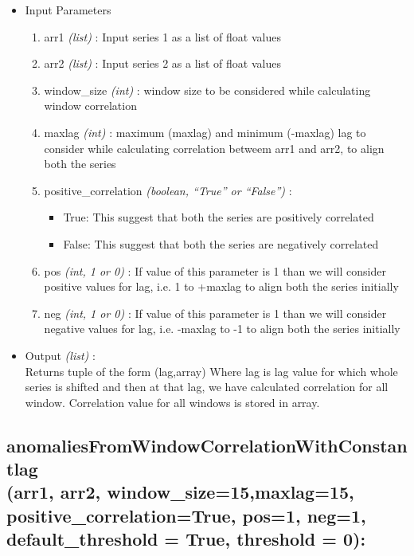 \begin{itemize}
 \item Input Parameters
 
 \begin{enumerate}
  \item arr1 \textit{(list)} : Input series 1 as a list of float values
  \item arr2 \textit{(list)} : Input series 2 as a list of float values
  \item window\_size \textit{(int)} : window size to be considered while 
calculating window correlation
  \item maxlag \textit{(int)} : maximum (maxlag) and minimum (-maxlag) lag to 
consider while calculating correlation betweem arr1 and arr2, to align both the 
series
  \item positive\_correlation \textit{(boolean, ``True'' or ``False'')} : 
      \begin{itemize}
       \item True: This suggest that both the series are positively correlated
       \item False: This suggest that both the series are negatively correlated
      \end{itemize}
      
  \item pos \textit{(int, 1 or 0)} : If value of this parameter is 1 than we 
will consider positive values for lag, i.e. 1 to +maxlag to align both the 
series initially
  \item neg \textit{(int, 1 or 0)} : If value of this parameter is 1 than we 
will consider negative values for lag, i.e. -maxlag to -1 to align both the 
series initially
  
 \end{enumerate}

 \item Output \textit{(list)} : \\
  Returns tuple of the form (lag,array)
Where lag is lag value for which whole series is shifted and then at that lag, 
we have calculated correlation for all window. Correlation value for all 
windows is stored in array.
 
\end{itemize}

\subsection{anomaliesFromWindowCorrelationWithConstantlag\\(arr1, arr2, 
window\_size=15,maxlag=15, \\positive\_correlation=True, pos=1, neg=1, \\
default\_threshold = True, threshold = 0):}


